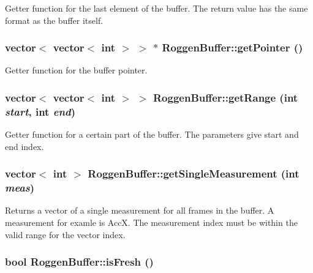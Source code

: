 \label{classRoggenBuffer_a1c1ee753d0654159c62a0ee4ae95d9a0}
Getter function for the last element of the buffer. The return value has the same format as the buffer itself. \hypertarget{classRoggenBuffer_a5fab9575ec2f4038c394009f689bffb7}{
\subsubsection[{getPointer}]{\setlength{\rightskip}{0pt plus 5cm}vector$<$ vector$<$ int $>$ $>$ $\ast$ RoggenBuffer::getPointer ()}}
\label{classRoggenBuffer_a5fab9575ec2f4038c394009f689bffb7}
Getter function for the buffer pointer. \hypertarget{classRoggenBuffer_ad952a6eec2e3aea2a071f191c0decd36}{
\subsubsection[{getRange}]{\setlength{\rightskip}{0pt plus 5cm}vector$<$ vector$<$ int $>$ $>$ RoggenBuffer::getRange (int {\em start}, \/  int {\em end})}}
\label{classRoggenBuffer_ad952a6eec2e3aea2a071f191c0decd36}
Getter function for a certain part of the buffer. The parameters give start and end index. \hypertarget{classRoggenBuffer_a08b39243af623747c975c4d92d9a62cd}{
\subsubsection[{getSingleMeasurement}]{\setlength{\rightskip}{0pt plus 5cm}vector$<$ int $>$ RoggenBuffer::getSingleMeasurement (int {\em meas})}}
\label{classRoggenBuffer_a08b39243af623747c975c4d92d9a62cd}
Returns a vector of a single measurement for all frames in the buffer. A measurement for examle is AccX. The measurement index must be within the valid range for the vector index. \hypertarget{classRoggenBuffer_a1e2fe9957cfdf7db79678d929809efb0}{
\subsubsection[{isFresh}]{\setlength{\rightskip}{0pt plus 5cm}bool RoggenBuffer::isFresh ()}}
